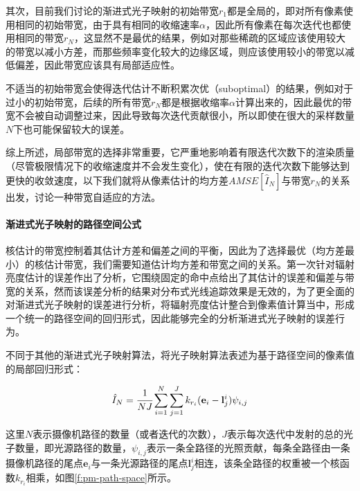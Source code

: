 其次，目前我们讨论的渐进式光子映射的初始带宽$r_1$都是全局的，即对所有像素使用相同的初始带宽，由于具有相同的收缩速率$\alpha$，因此所有像素在每次迭代也都使用相同的带宽$r_N$，这显然不是最优的结果，例如对那些稀疏的区域应该使用较大的带宽以减小方差，而那些频率变化较大的边缘区域，则应该使用较小的带宽以减低偏差，因此带宽应该具有局部适应性。

不适当的初始带宽会使得迭代估计不断积累次优（suboptimal）的结果，例如对于过小的初始带宽，后续的所有带宽$r_N$都是根据收缩率$\alpha$计算出来的，因此最优的带宽不会被自动调整过来，因此导致每次迭代贡献很小，所以即使在很大的采样数量$N$下也可能保留较大的误差。

综上所述，局部带宽的选择非常重要，它严重地影响着有限迭代次数下的渲染质量（尽管极限情况下的收缩速度并不会发生变化），使在有限的迭代次数下能够达到更快的收敛速度，以下我们就将从像素估计的均方差$AMSE[\hat{I}_N]$与带宽$r_N$的关系出发，讨论一种带宽自适应的方法。





\paragraph{渐进式光子映射的路径空间公式}
核估计的带宽控制着其估计方差和偏差之间的平衡，因此为了选择最优（均方差最小）的核估计带宽，我们需要知道估计均方差和带宽之间的关系。\cite{a:AProgressiveErrorEstimationFrameworkforPhotonDensityEstimation}第一次针对辐射亮度估计的误差作出了分析，它围绕固定的命中点给出了其估计的误差和偏差与带宽的关系，然而该误差分析的结果对分布式光线追踪效果是无效的，为了更全面的对渐进式光子映射的误差进行分析，\cite{a:AdaptiveProgressivePhotonMapping}将辐射亮度估计整合到像素值计算当中，形成一个统一的路径空间的回归形式，因此能够完全的分析渐进式光子映射的误差行为。

不同于其他的渐进式光子映射算法，\cite{a:AdaptiveProgressivePhotonMapping}将光子映射算法表述为基于路径空间的像素值的局部回归形式：

\begin{equation}
	\hat{I}_N= \cfrac{1}{NJ}\sum^{N}_{i=1}\sum^{J}_{j=1}k_{r_i}(\mathbf{e}_i-\mathbf{l}^{i}_j)\psi_{i,j}
\end{equation}

这里$N$表示摄像机路径的数量（或者迭代的次数），$J$表示每次迭代中发射的总的光子数量，即光源路径的数量，$\psi_{i,j}$表示一条全路径的光照贡献，每条全路径由一条摄像机路径的尾点$\mathbf{e}_i$与一条光源路径的尾点$\mathbf{l}^{i}_{j}$相连，该条全路径的权重被一个核函数$k_{r_i}$相乘，如图\ref{f:pm-path-space}所示。

